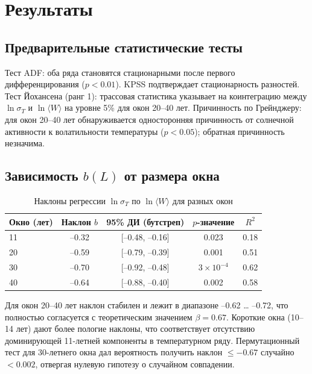 \documentclass[12pt,a4paper]{article}
\newcommand{\be}{\beta}
\begin{document}
	\section{Результаты}
	
	\subsection{Предварительные статистические тесты}
	
	Тест ADF: оба ряда становятся стационарными после первого дифференцирования (\(p < 0.01\)). KPSS подтверждает стационарность разностей.
	Тест Йохансена (ранг 1): трассовая статистика указывает на коинтеграцию между \(\ln \sigma_T\) и \(\ln \langle W \rangle\) на уровне 5\% для окон 20–40 лет.
	Причинность по Грейнджеру: для окон 20–40 лет обнаруживается односторонняя причинность от солнечной активности к волатильности температуры (\(p < 0.05\)); обратная причинность незначима.
	
	\subsection{Зависимость \(b(L)\) от размера окна}
	
	\begin{table}[htbp]
		\centering
		\caption{Наклоны регрессии \(\ln \sigma_T\) по \(\ln \langle W \rangle\) для разных окон}
		\label{tab:slopes}
		\begin{tabular}{@{}lcccc@{}}
			\toprule
			Окно (лет) & Наклон \(b\) & 95\% ДИ (бутстреп) & \(p\)-значение & \(R^2\) \\
			\midrule
			11 & –0.32 & [–0.48, –0.16] & 0.023 & 0.18 \\
			20 & –0.59 & [–0.79, –0.39] & 0.001 & 0.51 \\
			30 & –0.70 & [–0.92, –0.48] & \(3\times10^{-4}\) & 0.62 \\
			40 & –0.64 & [–0.88, –0.40] & 0.002 & 0.58 \\
			\bottomrule
		\end{tabular}
	\end{table}
	
	Для окон 20–40 лет наклон стабилен и лежит в диапазоне –0.62 … –0.72, что полностью согласуется с теоретическим значением \(\be = 0.67\). Короткие окна (10–14 лет) дают более пологие наклоны, что соответствует отсутствию доминирующей 11-летней компоненты в температурном ряду.
	Пермутационный тест для 30-летнего окна дал вероятность получить наклон \(\le -0.67\) случайно \(<0.002\), отвергая нулевую гипотезу о случайном совпадении.
	
\end{document}
